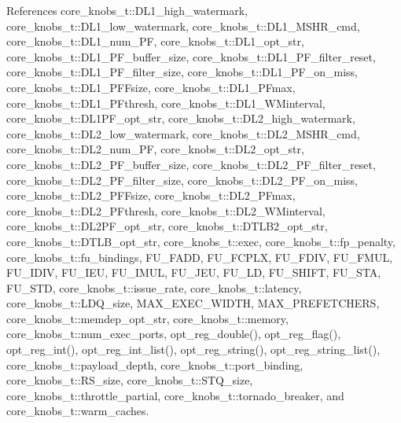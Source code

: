 References core\_\-knobs\_\-t::DL1\_\-high\_\-watermark, core\_\-knobs\_\-t::DL1\_\-low\_\-watermark, core\_\-knobs\_\-t::DL1\_\-MSHR\_\-cmd, core\_\-knobs\_\-t::DL1\_\-num\_\-PF, core\_\-knobs\_\-t::DL1\_\-opt\_\-str, core\_\-knobs\_\-t::DL1\_\-PF\_\-buffer\_\-size, core\_\-knobs\_\-t::DL1\_\-PF\_\-filter\_\-reset, core\_\-knobs\_\-t::DL1\_\-PF\_\-filter\_\-size, core\_\-knobs\_\-t::DL1\_\-PF\_\-on\_\-miss, core\_\-knobs\_\-t::DL1\_\-PFFsize, core\_\-knobs\_\-t::DL1\_\-PFmax, core\_\-knobs\_\-t::DL1\_\-PFthresh, core\_\-knobs\_\-t::DL1\_\-WMinterval, core\_\-knobs\_\-t::DL1PF\_\-opt\_\-str, core\_\-knobs\_\-t::DL2\_\-high\_\-watermark, core\_\-knobs\_\-t::DL2\_\-low\_\-watermark, core\_\-knobs\_\-t::DL2\_\-MSHR\_\-cmd, core\_\-knobs\_\-t::DL2\_\-num\_\-PF, core\_\-knobs\_\-t::DL2\_\-opt\_\-str, core\_\-knobs\_\-t::DL2\_\-PF\_\-buffer\_\-size, core\_\-knobs\_\-t::DL2\_\-PF\_\-filter\_\-reset, core\_\-knobs\_\-t::DL2\_\-PF\_\-filter\_\-size, core\_\-knobs\_\-t::DL2\_\-PF\_\-on\_\-miss, core\_\-knobs\_\-t::DL2\_\-PFFsize, core\_\-knobs\_\-t::DL2\_\-PFmax, core\_\-knobs\_\-t::DL2\_\-PFthresh, core\_\-knobs\_\-t::DL2\_\-WMinterval, core\_\-knobs\_\-t::DL2PF\_\-opt\_\-str, core\_\-knobs\_\-t::DTLB2\_\-opt\_\-str, core\_\-knobs\_\-t::DTLB\_\-opt\_\-str, core\_\-knobs\_\-t::exec, core\_\-knobs\_\-t::fp\_\-penalty, core\_\-knobs\_\-t::fu\_\-bindings, FU\_\-FADD, FU\_\-FCPLX, FU\_\-FDIV, FU\_\-FMUL, FU\_\-IDIV, FU\_\-IEU, FU\_\-IMUL, FU\_\-JEU, FU\_\-LD, FU\_\-SHIFT, FU\_\-STA, FU\_\-STD, core\_\-knobs\_\-t::issue\_\-rate, core\_\-knobs\_\-t::latency, core\_\-knobs\_\-t::LDQ\_\-size, MAX\_\-EXEC\_\-WIDTH, MAX\_\-PREFETCHERS, core\_\-knobs\_\-t::memdep\_\-opt\_\-str, core\_\-knobs\_\-t::memory, core\_\-knobs\_\-t::num\_\-exec\_\-ports, opt\_\-reg\_\-double(), opt\_\-reg\_\-flag(), opt\_\-reg\_\-int(), opt\_\-reg\_\-int\_\-list(), opt\_\-reg\_\-string(), opt\_\-reg\_\-string\_\-list(), core\_\-knobs\_\-t::payload\_\-depth, core\_\-knobs\_\-t::port\_\-binding, core\_\-knobs\_\-t::RS\_\-size, core\_\-knobs\_\-t::STQ\_\-size, core\_\-knobs\_\-t::throttle\_\-partial, core\_\-knobs\_\-t::tornado\_\-breaker, and core\_\-knobs\_\-t::warm\_\-caches.